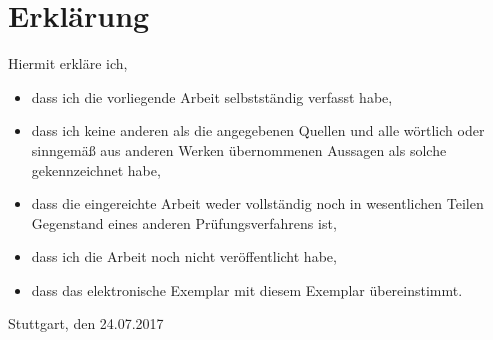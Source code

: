 	\restoregeometry

	\thispagestyle{empty}
	\cleardoublepage

	\chapter*{Erklärung}
	Hiermit erkläre ich,

	\begin{itemize}
		\item dass ich die vorliegende Arbeit selbstständig verfasst habe,
		\item dass ich keine anderen als die angegebenen Quellen und alle wörtlich oder sinngemäß aus anderen Werken übernommenen Aussagen als solche gekennzeichnet habe,
		\item dass die eingereichte Arbeit weder vollständig noch in wesentlichen Teilen Gegenstand eines anderen Prüfungsverfahrens ist,
		\item dass ich die Arbeit noch nicht veröffentlicht habe,
		\item dass das elektronische Exemplar mit diesem Exemplar übereinstimmt.
	\end{itemize}

	\bigskip

	Stuttgart, den 24.07.2017

	
	

	\clearpage		%
	\tableofcontents
	
	
	
	
	
	
	
	
	
	
	
	
	
	\begin{flushleft}
	\end{flushleft}

